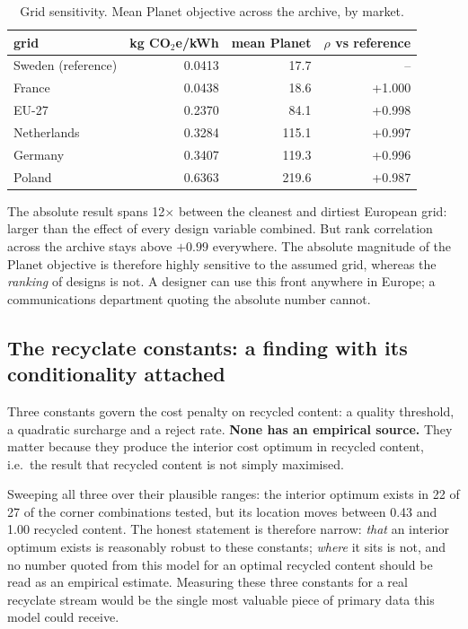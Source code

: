 \documentclass[11pt,a4paper]{article}
\begin{document}
\begin{table}[h]
\centering\small
\caption{Grid sensitivity. Mean Planet objective across the archive, by market.}
\label{tab:geo}
\begin{tabular}{lrrr}
\toprule
grid & \si{\kilo\gram} CO$_2$e/kWh & mean Planet & $\rho$ vs reference \\
\midrule
Sweden (reference) & 0.0413 & 17.7 & -- \\
France & 0.0438 & 18.6 & +1.000 \\
EU-27 & 0.2370 & 84.1 & +0.998 \\
Netherlands & 0.3284 & 115.1 & +0.997 \\
Germany & 0.3407 & 119.3 & +0.996 \\
Poland & 0.6363 & 219.6 & +0.987 \\
\bottomrule
\end{tabular}
\end{table}

The absolute result spans 12$\times$ between the cleanest and dirtiest
European grid: larger than the effect of every design variable combined. But
rank correlation across the archive stays above $+0.99$ everywhere. The
absolute magnitude of the Planet objective is therefore highly sensitive to
the assumed grid, whereas the \emph{ranking} of
designs is not. A designer can use this front anywhere in Europe; a
communications department quoting the absolute number cannot.

\subsection{The recyclate constants: a finding with its conditionality attached}

Three constants govern the cost penalty on recycled content: a quality
threshold, a quadratic surcharge and a reject rate. \textbf{None has an
empirical source.} They matter because they produce the interior cost optimum
in recycled content, i.e.\ the result that recycled content is not simply
maximised.

Sweeping all three over their plausible ranges: the interior optimum exists in
22 of 27 of the corner combinations tested, but its location moves between
0.43 and 1.00 recycled content. The honest statement is
therefore narrow: \emph{that} an interior optimum exists is reasonably robust to
these constants; \emph{where} it sits is not, and no number quoted from this
model for an optimal recycled content should be read as an empirical estimate.
Measuring these three constants for a real recyclate stream would be the single
most valuable piece of primary data this model could receive.
\end{document}
